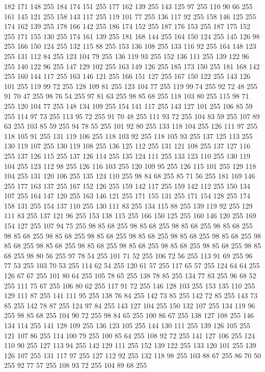 182 171 148 255 184 174 151 255 177 162 139 255 143 125 97 255 110 90 66 255 161 145 121 255 158 143 117 255 119 101 77 255 136 117 92 255 158 146 125 255 174 162 139 255 178 166 142 255 186 174 152 255 187 176 153 255 187 175 152 255 171 155 130 255 174 161 139 255 181 168 144 255 164 150 124 255 145 126 98 255 166 150 124 255 132 115 88 255 153 136 108 255 133 116 92 255 164 148 123 255 131 112 84 255 123 104 79 255 136 119 93 255 152 136 111 255 139 122 96 255 140 122 96 255 147 129 102 255 163 149 126 255 185 173 150 255 181 168 142 255 160 144 117 255 163 146 121 255 166 151 127 255 167 150 122 255 143 126 101 255 119 99 72 255 128 109 81 255 123 104 77 255 119 99 74 255 92 72 48 255 91 70 47 255 98 76 54 255 97 81 63 255 98 85 68 255 118 103 80 255 115 98 71 255 120 104 77 255 148 134 109 255 154 141 117 255 143 127 101 255 106 85 59 255 114 97 73 255 113 95 72 255 91 70 48 255 111 93 72 255 104 83 59 255 107 89 63 255 103 85 59 255 94 78 55 255
101 92 80 255 133 118 104 255 126 111 97 255 118 105 91 255 131 119 106 255 118 103 92 255 118 105 93 255 137 125 113 255 130 119 107 255 130 119 108 255 136 125 112 255 131 121 108 255 137 127 116 255 137 126 115 255 137 126 114 255 135 124 111 255 133 123 110 255 130 119 104 255 123 112 98 255 126 116 103 255 120 109 95 255 126 115 101 255 129 118 104 255 131 120 106 255 135 124 110 255 98 84 68 255 85 71 56 255 181 169 146 255 177 163 137 255 167 152 126 255 159 142 117 255 159 142 112 255 150 134 107 255 164 147 120 255 163 146 121 255 171 155 131 255 171 154 128 255 174 158 131 255 154 137 110 255 130 111 83 255 134 115 88 255 139 119 92 255 129 111 83 255 137 121 96 255 153 138 115 255 166 150 125 255 160 146 120 255 169 154 127 255 107 94 75 255 98 85 68 255 98 85 68 255 98 85 68 255 98 85 68 255 98 85 68 255 98 85 68 255 98 85 68 255 98 85 68 255 98 85 68 255 98 85 68 255 98 85 68 255 98 85 68 255 98 85 68 255 98 85 68 255 98 85 68 255
98 85 68 255 98 85 68 255 98 80 56 255 97 78 54 255 101 71 52 255 106 72 56 255 113 91 69 255 96 77 53 255 103 70 53 255 114 62 54 255 120 61 57 255 117 65 57 255 124 64 64 255 126 67 67 255 101 80 64 255 105 78 65 255 138 78 85 255 134 77 83 255 96 68 52 255 111 75 67 255 106 80 62 255 117 91 72 255 146 128 103 255 153 135 110 255 129 111 87 255 141 111 95 255 138 76 84 255 142 73 85 255 142 72 85 255 143 73 85 255 142 78 87 255 124 97 84 255 143 127 104 255 150 132 107 255 134 119 96 255 98 85 68 255 104 90 72 255 98 84 65 255 100 86 67 255 138 127 108 255 146 134 114 255 141 128 109 255 136 123 105 255 144 130 111 255 139 126 105 255 121 107 86 255 114 100 79 255 100 85 64 255 108 92 72 255 141 127 106 255 124 110 90 255 127 113 94 255 142 129 111 255 152 139 122 255 133 120 101 255 139 126 107 255 131 117 97 255 127 112 92 255 132 118 98 255 103 88 67 255 86 70 50 255 92 77 57 255 108 93 72 255 104 89 68 255
